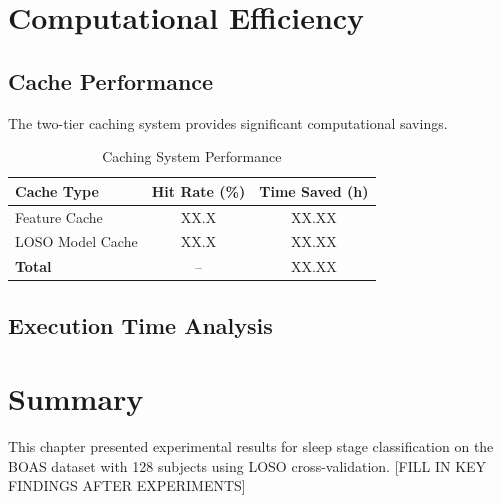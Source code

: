 \section{Computational Efficiency}
\label{sec:efficiency}

\subsection{Cache Performance}
\label{subsec:cache_performance}

The two-tier caching system provides significant computational savings.


\begin{table}[htbp]
    \centering
    \caption{Caching System Performance}
    \label{tab:cache_stats}
    \begin{tabular}{lcc}
        \toprule
        \textbf{Cache Type} & \textbf{Hit Rate (\%)} & \textbf{Time Saved (h)} \\
        \midrule
        Feature Cache & XX.X & XX.XX \\
        LOSO Model Cache & XX.X & XX.XX \\
        \midrule
        \textbf{Total} & -- & XX.XX \\
        \bottomrule
    \end{tabular}
\end{table}

\subsection{Execution Time Analysis}
\label{subsec:execution_time}


\section{Summary}
\label{sec:results_summary}


This chapter presented experimental results for sleep stage classification on the BOAS dataset with 128 subjects using LOSO cross-validation. [FILL IN KEY FINDINGS AFTER EXPERIMENTS]
